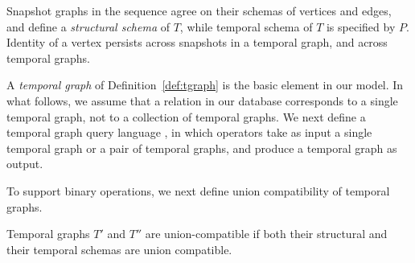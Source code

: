 Snapshot graphs in the sequence agree on their schemas of vertices and
edges, and define a {\em structural schema} of $T$, while temporal
schema of $T$ is specified by $P$.  Identity of a vertex persists
across snapshots in a temporal graph, and across temporal graphs.

A {\em temporal graph} of Definition~\ref{def:tgraph} is the basic
element in our model.  In what follows, we assume that a relation in
our database corresponds to a single temporal graph, not to a
collection of temporal graphs.  We next define a temporal graph query
language \ql, in which operators take as input a single temporal graph
or a pair of temporal graphs, and produce a temporal graph as output.

To support binary operations, we next define union compatibility of
temporal graphs.

\begin{definition}
\label{def:tuc}
Temporal graphs $T'$ and $T''$ are union-compatible if both their
structural and their temporal schemas are union compatible. 
\end{definition}




